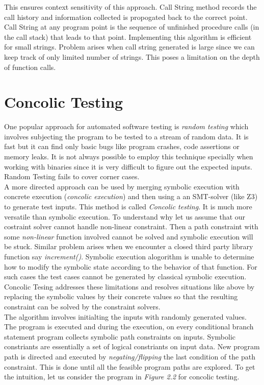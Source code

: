 \documentclass[12pt,oneside]{book}
\begin{document}
This ensures context sensitivity of this approach. Call String method records the call history and information collected is propogated back to the correct point. Call String at any program point is the sequence of unfinished procedure calls (in the call stack) that leads to that point. Implementing this algorithm is efficient for small strings. Problem arises when call string generated is large since we can keep track of only limited number of strings. This poses a limitation on the depth of function calls.



\section {Concolic Testing}

One popular approach for automated software testing is \textit{random testing}\cite{random} which involves subjecting the program to be tested to a stream of random data. It is fast but it can find only basic bugs like program crashes, code assertions or memory leaks. It is not always possible to employ this technique specially when working with binaries since it is very difficult to figure out the expected inputs. Random Testing fails to cover corner cases.\\

A more directed approach can be used by merging symbolic execution with concrete execution (\textit{concolic execution}\cite{dart}) and then using a an SMT-solver (like Z3\cite{z3}) to generate test inputs. This method is called \textit{Concolic testing}. It is much more versatile than symbolic execution. To understand why let us assume that our costraint solver cannot handle non-linear constraint. Then a path constraint with some \textit{non-linear} function involved cannot be solved and symbolic execution will be stuck. Similar problem arises when we encounter a closed third party library function say \textit{increment()}. Symbolic execution alogorithm is unable to determine how to modify the symbolic state according to the behavior of that function. For such cases the test cases cannot be generated by classical symbolic execution\cite{decadeslater}. Concolic Tesing addresses these limitations and resolves situations like above by replacing the symbolic values by their concrete values so that the resulting constraint can be solved by the constraint solvers.\\

The algorithm involves initialting the inputs with randomly generated values. The program is executed and during the execution, on every conditional branch statement program collects symbolic path constraints on inputs. Symbolic constriants are essentially a set of logical constriants on input data. New program path is directed and executed by \textit{negating/flipping} the last condition of the path constraint. This is done until all the feasible program paths are explored. To get the intuition, let us consider the program in \textit{Figure 2.2} for concolic testing.  
\end{document}
